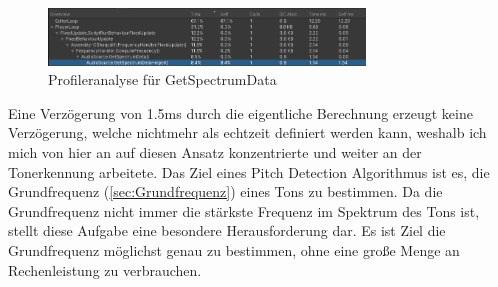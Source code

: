 \begin{figure}[h]
    \centering
    \includegraphics[width=0.75\textwidth]{profiler_spectrum.png}
    \caption{Profileranalyse für GetSpectrumData}
    \label{sec:profiler_spectrum}
\end{figure}
Eine Verzögerung von 1.5ms durch die eigentliche Berechnung erzeugt keine Verzögerung, welche nichtmehr als echtzeit definiert werden kann, weshalb ich mich von hier an auf diesen Ansatz konzentrierte und weiter an der Tonerkennung arbeitete. Das Ziel eines Pitch Detection Algorithmus ist es, die Grundfrequenz (\ref{sec:Grundfrequenz}) eines Tons zu bestimmen. Da die Grundfrequenz nicht immer die stärkste Frequenz im Spektrum des Tons ist, stellt diese Aufgabe eine besondere Herausforderung dar. Es ist Ziel die Grundfrequenz möglichst genau zu bestimmen, ohne eine große Menge an Rechenleistung zu verbrauchen. \\
